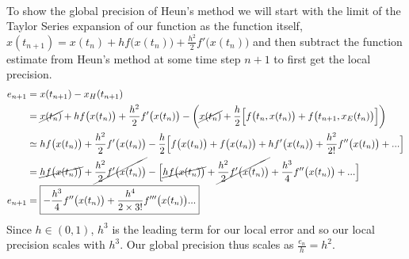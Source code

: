 \documentclass[11pt, oneside]{article}   	%
\newcommand{\prob}[2]{
\indent \\
\noindent{\color{green!50!blue}\bf {\large#1.}}
{\normalfont #2}
}
\begin{document}
\prob{4}{To show the global precision of Heun's method we will start with the limit of the Taylor Series expansion of our function as the function itself, $x(t_{n+1}) = x(t_n) + h f\big(x(t_n)\big) + \frac{h^2}{2}f'\big(x(t_n)\big)$} and then subtract the function estimate from Heun's method at some time step $n+1$ to first get the local precision.
	\begin{align*}
		e_{n+1} &= x(t_{n+1}) - x_H(t_{n+1})
		\\
		&=
		\cancel{x(t_n)} + h f\big(x(t_n)\big) + \frac{h^2}{2}f'\big(x(t_n)\big)
		-
		\bigg(
		\cancel{x(t_n)} + \frac{h}{2}
			\Big[
			f\big(t_n,x(t_n)\big) + f\big(t_{n+1},x_E(t_n)\big)
			\Big]
		\bigg)
		\\
		&\simeq
		h f\big(x(t_n)\big) + \frac{h^2}{2}f'\big(x(t_n)\big)
		-
		\frac{h}{2}
			\Big[
			f\big(x(t_n)\big) + f\big(x(t_n)\big) + h f'\big(x(t_n)\big) + \frac{h^2}{2!}f''\big(x(t_n)\big) + ...
			\Big]
		\\
		&=
		\cancel{h f\big(x(t_n)\big)}
		+
		\cancel{\frac{h^2}{2}f'\big(x(t_n)\big)}
		-
		\Big[
			\cancel{h f\big(x(t_n)\big)}
			+
			\cancel{\frac{h^2}{2} f'\big(x(t_n)\big)}
			+
			\frac{h^3}{4}f''\big(x(t_n)\big)
			+ ...
		\Big]
		\\
		e_{n+1}
		&=
		\boxed{
		-
		\frac{h^3}{4}f''\big(x(t_n)\big)
		+
		\frac{h^4}{2\times3!}f'''\big(x(t_n)\big)...
		}
	\end{align*}
	Since $h \in (0,1)$, $h^3$ is the leading term for our local error and so our local precision scales with $h^3$. Our global precision thus scales as $\boxed{\frac{e_n}{h} = h^2}$.
\end{document}
